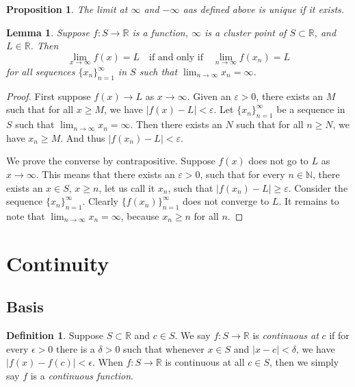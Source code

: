 \documentclass{article}
\newtheorem{lemma}[theorem]{Lemma}
\newtheorem{prop}[theorem]{Proposition}
\theoremstyle{definition}
\newtheorem{defi}{Definition}[section]
\begin{document}
\begin{prop}
    The limit at $\infty$ and $-\infty$ aas defined above is unique if it exists.
\end{prop}


\begin{lemma}
    Suppose \( f: S \rightarrow \mathbb{R} \) is a function, \( \infty \) is a cluster point of \( S \subset \mathbb{R} \), and \( L \in \mathbb{R} \). Then
\[
\lim_{x \rightarrow \infty} f(x) = L \quad \text{if and only if} \quad \lim_{n \rightarrow \infty} f(x_n) = L
\]
for all sequences \( \{x_n\}_{n=1}^{\infty} \) in \( S \) such that \( \lim_{n \rightarrow \infty} x_n = \infty \).
\end{lemma}

\begin{proof}
    First suppose \( f(x) \rightarrow L \) as \( x \rightarrow \infty \). Given an \( \varepsilon > 0 \), there exists an \( M \) such that for all \( x \geq M \), we have \( |f(x) - L| < \varepsilon \). Let \( \{x_n\}_{n=1}^{\infty} \) be a sequence in \( S \) such that \( \lim_{n \rightarrow \infty} x_n = \infty \). Then there exists an \( N \) such that for all \( n \geq N \), we have \( x_n \geq M \). And thus \( |f(x_n) - L| < \varepsilon \).

We prove the converse by contrapositive. Suppose \( f(x) \) does not go to \( L \) as \( x \rightarrow \infty \). This means that there exists an \( \varepsilon > 0 \), such that for every \( n \in \mathbb{N} \), there exists an \( x \in S \), \( x \geq n \), let us call it \( x_n \), such that \( |f(x_n) - L| \geq \varepsilon \). Consider the sequence \( \{x_n\}_{n=1}^{\infty} \). Clearly \( \{f(x_n)\}_{n=1}^{\infty} \) does not converge to \( L \). It remains to note that \( \lim_{n \rightarrow \infty} x_n = \infty \), because \( x_n \geq n \) for all \( n \).
\end{proof}




\section{Continuity}

\subsection{Basis}

\begin{defi}
    Suppose \( S \subset \mathbb{R} \) and \( c \in S \). We say \( f: S \rightarrow \mathbb{R} \) is \textit{continuous at} \( c \) if for every \( \epsilon > 0 \) there is a \( \delta > 0 \) such that whenever \( x \in S \) and \( |x - c| < \delta \), we have \( |f(x) - f(c)| < \epsilon \). When \( f: S \rightarrow \mathbb{R} \) is continuous at all \( c \in S \), then we simply say \( f \) is a \textit{continuous function}.    
\end{defi}
\end{document}
